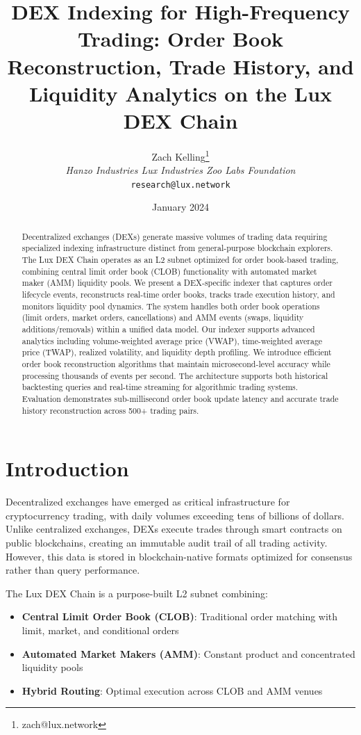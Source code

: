 \documentclass[11pt,twocolumn]{article}
\title{DEX Indexing for High-Frequency Trading: Order Book Reconstruction, Trade History, and Liquidity Analytics on the Lux DEX Chain}
\author{Zach Kelling\thanks{zach@lux.network} \\ \textit{Hanzo Industries \quad Lux Industries \quad Zoo Labs Foundation} \\ \texttt{research@lux.network}}
\date{January 2024}
\begin{document}
\maketitle

\begin{abstract}
Decentralized exchanges (DEXs) generate massive volumes of trading data requiring specialized indexing infrastructure distinct from general-purpose blockchain explorers. The Lux DEX Chain operates as an L2 subnet optimized for order book-based trading, combining central limit order book (CLOB) functionality with automated market maker (AMM) liquidity pools. We present a DEX-specific indexer that captures order lifecycle events, reconstructs real-time order books, tracks trade execution history, and monitors liquidity pool dynamics. The system handles both order book operations (limit orders, market orders, cancellations) and AMM events (swaps, liquidity additions/removals) within a unified data model. Our indexer supports advanced analytics including volume-weighted average price (VWAP), time-weighted average price (TWAP), realized volatility, and liquidity depth profiling. We introduce efficient order book reconstruction algorithms that maintain microsecond-level accuracy while processing thousands of events per second. The architecture supports both historical backtesting queries and real-time streaming for algorithmic trading systems. Evaluation demonstrates sub-millisecond order book update latency and accurate trade history reconstruction across 500+ trading pairs.
\end{abstract}

\section{Introduction}

Decentralized exchanges have emerged as critical infrastructure for cryptocurrency trading, with daily volumes exceeding tens of billions of dollars. Unlike centralized exchanges, DEXs execute trades through smart contracts on public blockchains, creating an immutable audit trail of all trading activity. However, this data is stored in blockchain-native formats optimized for consensus rather than query performance.

The Lux DEX Chain is a purpose-built L2 subnet combining:

\begin{itemize}
\item \textbf{Central Limit Order Book (CLOB)}: Traditional order matching with limit, market, and conditional orders
\item \textbf{Automated Market Makers (AMM)}: Constant product and concentrated liquidity pools
\item \textbf{Hybrid Routing}: Optimal execution across CLOB and AMM venues
\end{itemize}
\end{document}
